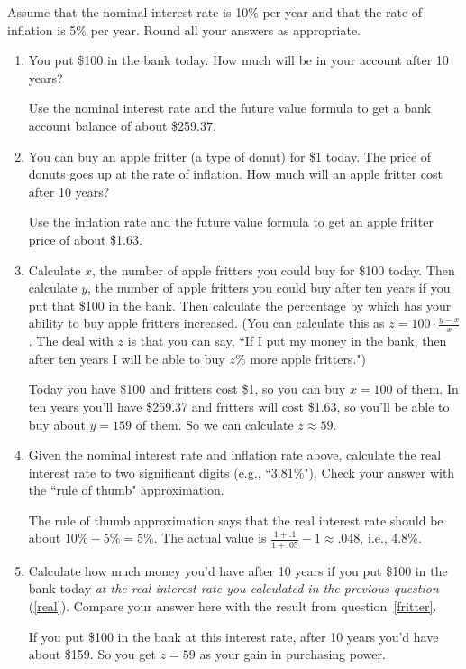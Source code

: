\documentclass[twoside]{article}
\begin{document}
\noindent Assume that the nominal interest rate is 10\% per year and that the rate of inflation is 5\% per year. Round all your answers
as appropriate.
    \begin{enumerate}
    \item You put \$100 in the bank today. How much will be in your account after 10 years?

\begin{KEY}
Use the nominal interest rate and the future value formula to get a bank account balance of about \$259.37.
\end{KEY}

    \item You can buy an apple fritter (a type of donut) for \$1 today. The price of donuts goes up at the rate of inflation. How much will an apple fritter cost after 10 years?

\begin{KEY}
Use the inflation rate and the future value formula to get an apple fritter price of about \$1.63.
\end{KEY}

    \item Calculate $x$, the number of apple fritters you could buy for \$100 today. Then calculate $y$, the number of apple fritters you could buy after ten years if you put that \$100 in the bank. Then calculate the percentage by which has your ability to buy apple fritters increased. (You can calculate this as $\displaystyle z=100\cdot \frac{y-x}{x}$. The deal with $z$ is that you can say, ``If I put my money in the bank, then after ten years I will be able to buy $z\%$ more apple fritters.") \label{fritter}

\begin{KEY}
Today you have \$100 and fritters cost \$1, so you can buy $x=100$ of them. In ten years you'll have \$259.37 and fritters will cost \$1.63, so you'll be able to buy about $y=159$ of them. So we can calculate $z\approx 59$.
\end{KEY}

    \item Given the nominal interest rate and inflation rate above, calculate the real interest rate to two significant digits (e.g., ``3.81\%"). Check your answer with the ``rule of thumb" approximation. \label{real}

\begin{KEY}
The rule of thumb approximation says that the real interest rate should be about $10\% - 5\% = 5\%$. The actual value is $\frac{1+.1}{1+.05}-1\approx .048$, i.e., 4.8\%.
\end{KEY}

    \item Calculate how much money you'd have after 10 years if you put \$100 in the bank today \emph{at the real interest rate you calculated in the previous question} (\ref{real}). Compare your answer here with the result from question~\ref{fritter}.

\begin{KEY}
If you put \$100 in the bank at this interest rate, after 10 years you'd have about \$159. So you get $z=59$ as your gain in purchasing power.
\end{KEY}
    \end{enumerate}
\end{document}
